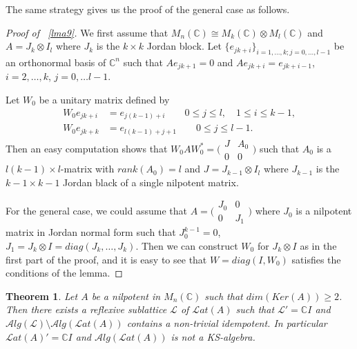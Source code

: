 \documentclass[a4paper,10pt]{amsart}
\newtheorem{theorem}{Theorem}[section]
\theoremstyle{refs}
\newcommand{\LLL}{\mathcal L} %
\newcommand{\Lat}{\mathcal Lat}
\newcommand{\Alg}{\mathcal Alg}
\newcommand{\C}{\mathbb C} %
\begin{document}
The same strategy gives us the proof of the general case as follows.

\begin{proof}[Proof of ~\cref{lma9}]
We first assume that $M_n(\C) \cong M_k(\C) \otimes M_l(\C)$ and
$A = J_k \otimes I_{l}$ where $J_k$ is
the $k \times k$ Jordan block.
Let $\{e_{jk + i}\}_{i=1,\ldots,k; j = 0, \ldots,l-1}$ be an
orthonormal
basis of $\C^{n}$ such that $A e_{jk+1} =
0$ and $Ae_{jk+i} =  e_{jk+i-1}$, $i = 2, \ldots, k$, $j= 0, \ldots l-1$.

Let $W_{0}$ be a unitary matrix defined by
\begin{align*}
 W_{0} e_{jk + i} &= e_{j(k-1) + i} \qquad 0 \leq j \leq l, \quad 1 \leq i \leq
k-1,\\
 W_{0} e_{jk + k} &= e_{l(k - 1) + j + 1} \qquad 0 \leq j \leq l-1.
\end{align*}
Then an easy computation shows that $W_{0}AW_{0}^{*} = \bigl(\begin{smallmatrix}
       J & A_{0}\\
       0 & 0
      \end{smallmatrix}\bigr)$ such that $A_{0}$
is a $l(k-1) \times l$-matrix with $rank(A_{0})=l$ and $J = J_{k-1} \otimes
I_{l}$ where $J_{k-1}$ is the $k-1 \times k-1$ Jordan black of a single
nilpotent matrix.

For the general case, we could assume that
$A = \bigl(\begin{smallmatrix}
       J_0 & 0\\
       0 & J_1
      \end{smallmatrix}\bigr)$
where $J_{0}$ is a nilpotent matrix in Jordan normal form such that
$J_{0}^{k-1} = 0$, $J_{1} = J_{k} \otimes I = diag(J_{k}, \ldots,
J_{k})$. Then we can construct $W_0$ for $J_{k}\otimes I$ as in the first
part of the proof, and it is easy to see that $W = diag(I, W_{0})$
satisfies the conditions of the lemma.
\end{proof}


\begin{theorem}\label{thm2}
Let $A$ be a nilpotent in $M_n(\C)$ such that $dim(Ker(A)) \geq 2$. Then there
exists a reflexive sublattice $\LLL$ of $\Lat(A)$ such that $\LLL' = \C I$ and
$\Alg(\LLL) \setminus \Alg(\Lat(A))$ contains a non-trivial idempotent. In
particular $\Lat(A)' = \C I$ and $\Alg(\Lat(A))$ is not a KS-algebra.
\end{theorem}
\end{document}
